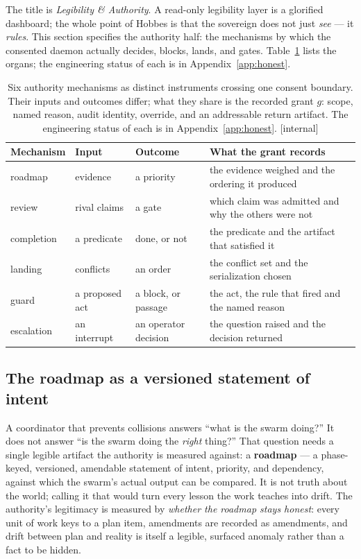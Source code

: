 \documentclass[11pt,a4paper]{article}
\theoremstyle{definition}
\theoremstyle{plain}
\begin{document}
The title is \emph{Legibility \& Authority}. A read-only legibility layer is a
glorified dashboard; the whole point of Hobbes is that the sovereign does not just
\emph{see} --- it \emph{rules}. This section specifies the authority half: the
mechanisms by which the consented daemon actually decides, blocks, lands, and
gates. Table~\ref{tab:ls-authority-organs} lists the organs; the engineering status of
each is in Appendix~\ref{app:honest}.

\begin{table}[H]
\centering
\caption{Six authority mechanisms as distinct instruments crossing one consent boundary. Their inputs and outcomes differ; what they share is the recorded grant $g$: scope, named reason, audit identity, override, and an addressable return artifact. The engineering status of each is in Appendix~\ref{app:honest}. [internal]}
\label{tab:ls-authority-organs}
\small
\renewcommand{\arraystretch}{1.15}
\begin{tabularx}{\linewidth}{@{}l >{\raggedright\arraybackslash}X >{\raggedright\arraybackslash}X >{\raggedright\arraybackslash}X@{}}
\toprule
\textbf{Mechanism} & \textbf{Input} & \textbf{Outcome} & \textbf{What the grant records} \\
\midrule
roadmap & evidence & a priority & the evidence weighed and the ordering it produced \\
review & rival claims & a gate & which claim was admitted and why the others were not \\
completion & a predicate & done, or not & the predicate and the artifact that satisfied it \\
landing & conflicts & an order & the conflict set and the serialization chosen \\
guard & a proposed act & a block, or passage & the act, the rule that fired and the named reason \\
escalation & an interrupt & an operator decision & the question raised and the decision returned \\
\bottomrule
\end{tabularx}
\end{table}

\subsection{The roadmap as a versioned statement of intent}\label{sec:roadmap}

A coordinator that prevents collisions answers ``what is the swarm doing?'' It does
not answer ``is the swarm doing the \emph{right} thing?'' That question needs a
single legible artifact the authority is measured against: a \textbf{roadmap} --- a
phase-keyed, versioned, amendable statement of intent, priority, and dependency,
against which the swarm's actual output can be compared. It is not truth about the
world; calling it that would turn every lesson the work teaches into drift. The
authority's legitimacy is measured by \emph{whether the roadmap stays honest}: every
unit of work keys to a plan item, amendments are recorded as amendments, and drift
between plan and reality is itself a legible, surfaced anomaly rather than a fact to
be hidden.
\end{document}
